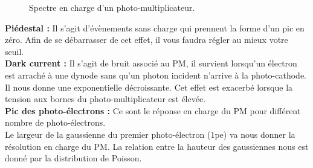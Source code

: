 \begin{figure}[!h]
    \caption{\label{fig:spectre} Spectre en charge d'un photo-multiplicateur.}
\end{figure}

\textbf{Piédestal :} Il s'agit d'évènements sans charge qui prennent la forme d'un pic en zéro. Afin de se débarrasser de cet effet, il vous faudra régler au mieux votre seuil.\\

\textbf{Dark current :} Il s'agit de bruit associé au PM, il survient lorsqu'un électron est arraché à une dynode sans qu'un photon incident n'arrive à la photo-cathode. Il nous donne une exponentielle décroissante. Cet effet est exacerbé lorsque la tension aux bornes du photo-multiplicateur est élevée. \\

\textbf{Pic des photo-électrons :} Ce sont le réponse en charge du PM pour différent nombre de photo-électrons.\\

Le largeur de la gaussienne du premier photo-électron (1pe) va nous donner la résolution en charge du PM. La relation entre la hauteur des gaussiennes nous est donné par la distribution de Poisson.



